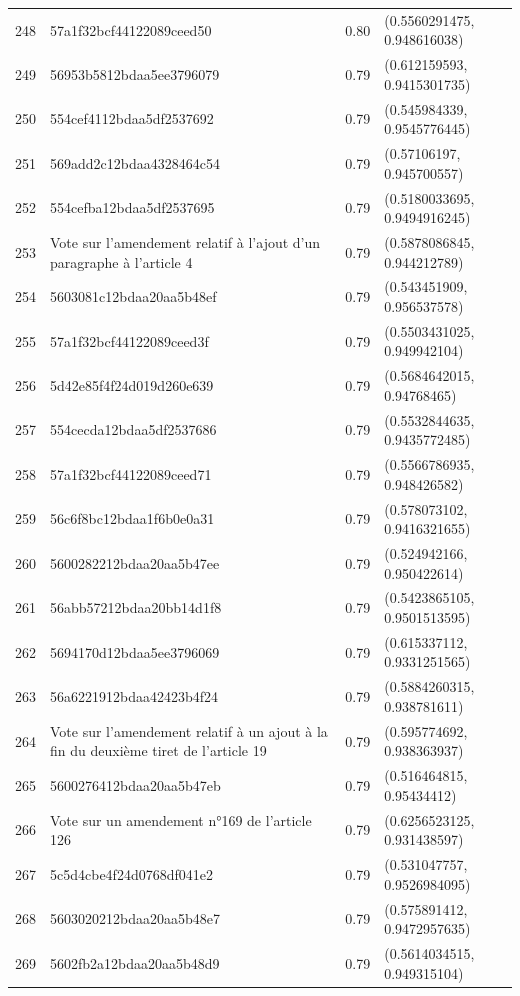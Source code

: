 \begin{table}[ht]
\begin{tabular}{rlrl}
  248 & 57a1f32bcf44122089ceed50 & 0.80 & (0.5560291475, 0.948616038) \\ 
  249 & 56953b5812bdaa5ee3796079 & 0.79 & (0.612159593, 0.9415301735) \\ 
  250 & 554cef4112bdaa5df2537692 & 0.79 & (0.545984339, 0.9545776445) \\ 
  251 & 569add2c12bdaa4328464c54 & 0.79 & (0.57106197, 0.945700557) \\ 
  252 & 554cefba12bdaa5df2537695 & 0.79 & (0.5180033695, 0.9494916245) \\ 
  253 & Vote sur l'amendement relatif à l'ajout d'un paragraphe à l'article 4 & 0.79 & (0.5878086845, 0.944212789) \\ 
  254 & 5603081c12bdaa20aa5b48ef & 0.79 & (0.543451909, 0.956537578) \\ 
  255 & 57a1f32bcf44122089ceed3f & 0.79 & (0.5503431025, 0.949942104) \\ 
  256 & 5d42e85f4f24d019d260e639 & 0.79 & (0.5684642015, 0.94768465) \\ 
  257 & 554cecda12bdaa5df2537686 & 0.79 & (0.5532844635, 0.9435772485) \\ 
  258 & 57a1f32bcf44122089ceed71 & 0.79 & (0.5566786935, 0.948426582) \\ 
  259 & 56c6f8bc12bdaa1f6b0e0a31 & 0.79 & (0.578073102, 0.9416321655) \\ 
  260 & 5600282212bdaa20aa5b47ee & 0.79 & (0.524942166, 0.950422614) \\ 
  261 & 56abb57212bdaa20bb14d1f8 & 0.79 & (0.5423865105, 0.9501513595) \\ 
  262 & 5694170d12bdaa5ee3796069 & 0.79 & (0.615337112, 0.9331251565) \\ 
  263 & 56a6221912bdaa42423b4f24 & 0.79 & (0.5884260315, 0.938781611) \\ 
  264 & Vote sur l'amendement relatif à un ajout à la fin du deuxième tiret de l'article 19 & 0.79 & (0.595774692, 0.938363937) \\ 
  265 & 5600276412bdaa20aa5b47eb & 0.79 & (0.516464815, 0.95434412) \\ 
  266 & Vote sur un amendement n°169 de l'article 126 & 0.79 & (0.6256523125, 0.931438597) \\ 
  267 & 5c5d4cbe4f24d0768df041e2 & 0.79 & (0.531047757, 0.9526984095) \\ 
  268 & 5603020212bdaa20aa5b48e7 & 0.79 & (0.575891412, 0.9472957635) \\ 
  269 & 5602fb2a12bdaa20aa5b48d9 & 0.79 & (0.5614034515, 0.949315104) \\ 

\end{tabular}
\end{table}
